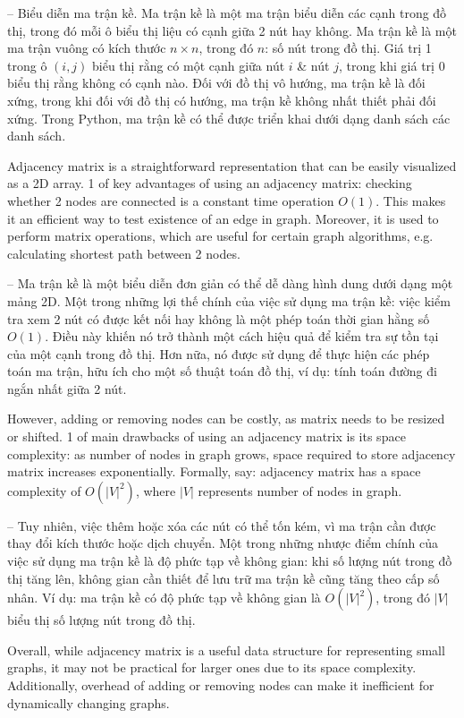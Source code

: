 \documentclass{article}
\begin{document}
\begin{itemize}
\begin{itemize}
\begin{itemize}
            -- {\sf Biểu diễn ma trận kề.} Ma trận kề là một ma trận biểu diễn các cạnh trong đồ thị, trong đó mỗi ô biểu thị liệu có cạnh giữa 2 nút hay không. Ma trận kề là một ma trận vuông có kích thước $n\times n$, trong đó $n$: số nút trong đồ thị. Giá trị 1 trong ô $(i, j)$ biểu thị rằng có một cạnh giữa nút $i$ \& nút $j$, trong khi giá trị 0 biểu thị rằng không có cạnh nào. Đối với đồ thị vô hướng, ma trận kề là đối xứng, trong khi đối với đồ thị có hướng, ma trận kề không nhất thiết phải đối xứng. Trong Python, ma trận kề có thể được triển khai dưới dạng danh sách các danh sách.

            Adjacency matrix is a straightforward representation that can be easily visualized as a 2D array. 1 of key advantages of using an adjacency matrix: checking whether 2 nodes are connected is a constant time operation $O(1)$. This makes it an efficient way to test existence of an edge in graph. Moreover, it is used to perform matrix operations, which are useful for certain graph algorithms, e.g. calculating shortest path between 2 nodes.

            -- Ma trận kề là một biểu diễn đơn giản có thể dễ dàng hình dung dưới dạng một mảng 2D. Một trong những lợi thế chính của việc sử dụng ma trận kề: việc kiểm tra xem 2 nút có được kết nối hay không là một phép toán thời gian hằng số $O(1)$. Điều này khiến nó trở thành một cách hiệu quả để kiểm tra sự tồn tại của một cạnh trong đồ thị. Hơn nữa, nó được sử dụng để thực hiện các phép toán ma trận, hữu ích cho một số thuật toán đồ thị, ví dụ: tính toán đường đi ngắn nhất giữa 2 nút.

            However, adding or removing nodes can be costly, as matrix needs to be resized or shifted. 1 of main drawbacks of using an adjacency matrix is its space complexity: as number of nodes in graph grows, space required to store adjacency matrix increases exponentially. Formally, say: adjacency matrix has a space complexity of $O(|V|^2)$, where $|V|$ represents number of nodes in graph.

            -- Tuy nhiên, việc thêm hoặc xóa các nút có thể tốn kém, vì ma trận cần được thay đổi kích thước hoặc dịch chuyển. Một trong những nhược điểm chính của việc sử dụng ma trận kề là độ phức tạp về không gian: khi số lượng nút trong đồ thị tăng lên, không gian cần thiết để lưu trữ ma trận kề cũng tăng theo cấp số nhân. Ví dụ: ma trận kề có độ phức tạp về không gian là $O(|V|^2)$, trong đó $|V|$ biểu thị số lượng nút trong đồ thị.

            Overall, while adjacency matrix is a useful data structure for representing small graphs, it may not be practical for larger ones due to its space complexity. Additionally, overhead of adding or removing nodes can make it inefficient for dynamically changing graphs.


\end{itemize}
\end{itemize}
\end{itemize}
\end{document}
